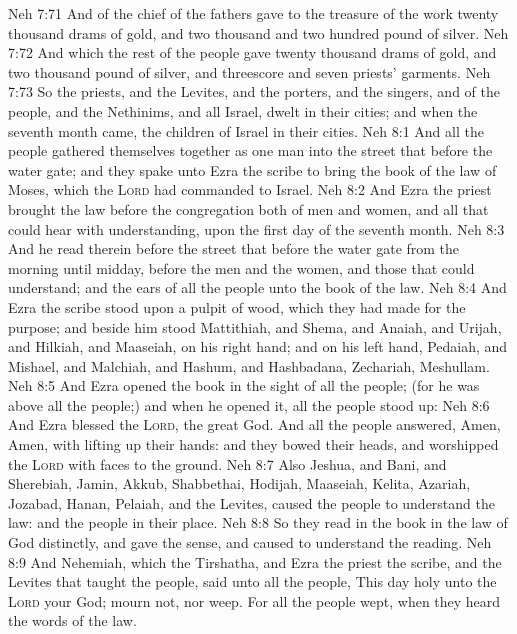\vs Neh 7:71 And  of the chief of the fathers gave to the treasure of the work twenty thousand drams of gold, and two thousand and two hundred pound of silver.
\vs Neh 7:72 And  which the rest of the people gave  twenty thousand drams of gold, and two thousand pound of silver, and threescore and seven priests' garments.
\vs Neh 7:73 So the priests, and the Levites, and the porters, and the singers, and  of the people, and the Nethinims, and all Israel, dwelt in their cities; and when the seventh month came, the children of Israel  in their cities.
\vs Neh 8:1 And all the people gathered themselves together as one man into the street that  before the water gate; and they spake unto Ezra the scribe to bring the book of the law of Moses, which the \textsc{Lord} had commanded to Israel.
\vs Neh 8:2 And Ezra the priest brought the law before the congregation both of men and women, and all that could hear with understanding, upon the first day of the seventh month.
\vs Neh 8:3 And he read therein before the street that  before the water gate from the morning until midday, before the men and the women, and those that could understand; and the ears of all the people  unto the book of the law.
\vs Neh 8:4 And Ezra the scribe stood upon a pulpit of wood, which they had made for the purpose; and beside him stood Mattithiah, and Shema, and Anaiah, and Urijah, and Hilkiah, and Maaseiah, on his right hand; and on his left hand, Pedaiah, and Mishael, and Malchiah, and Hashum, and Hashbadana, Zechariah,  Meshullam.
\vs Neh 8:5 And Ezra opened the book in the sight of all the people; (for he was above all the people;) and when he opened it, all the people stood up:
\vs Neh 8:6 And Ezra blessed the \textsc{Lord}, the great God. And all the people answered, Amen, Amen, with lifting up their hands: and they bowed their heads, and worshipped the \textsc{Lord} with  faces to the ground.
\vs Neh 8:7 Also Jeshua, and Bani, and Sherebiah, Jamin, Akkub, Shabbethai, Hodijah, Maaseiah, Kelita, Azariah, Jozabad, Hanan, Pelaiah, and the Levites, caused the people to understand the law: and the people  in their place.
\vs Neh 8:8 So they read in the book in the law of God distinctly, and gave the sense, and caused  to understand the reading.
\vs Neh 8:9 And Nehemiah, which  the Tirshatha, and Ezra the priest the scribe, and the Levites that taught the people, said unto all the people, This day  holy unto the \textsc{Lord} your God; mourn not, nor weep. For all the people wept, when they heard the words of the law.
